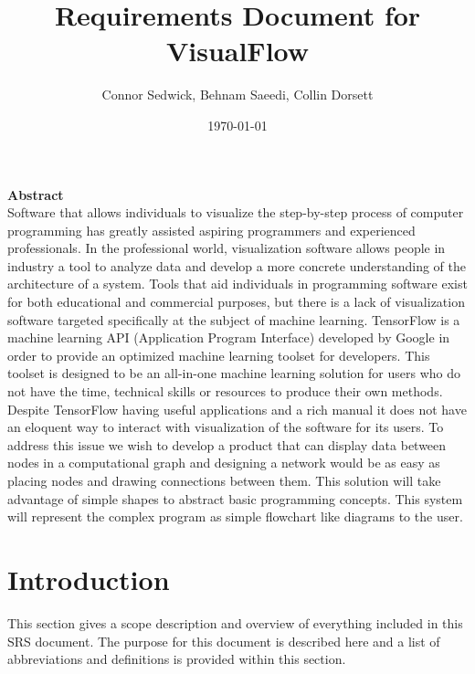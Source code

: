 \documentclass[journal,10pt,onecolumn,compsoc]{IEEEtran} \usepackage[margin=1.0in]{geometry} \usepackage{pdfpages} \usepackage{graphicx}
\title{Requirements Document for VisualFlow}
\author{Connor Sedwick, Behnam Saeedi,  Collin Dorsett}
\date{\today}
\begin{document}
\maketitle
\noindent \textbf{Abstract} \\
			\indent 
			Software that allows individuals to visualize the step-by-step process of computer programming has greatly assisted aspiring programmers and experienced professionals.
	In the professional world, visualization software allows people in industry a tool to analyze data and develop a more concrete understanding of the architecture of a system. 
	Tools that aid individuals in programming software exist for both educational and commercial purposes, but there is a lack of visualization software targeted specifically at the subject of machine learning.
			TensorFlow is a machine learning API (Application Program Interface) developed by Google in order to provide an optimized machine learning toolset for developers.
			 This toolset is designed to be an all-in-one machine learning solution for users who do not have the time, technical skills or resources to produce their own methods.
			 Despite TensorFlow having useful applications and a rich manual it does not have an eloquent way to interact with visualization of the software for its users.
			 To address this issue we wish to develop a product that can display data between nodes in a computational graph and designing a network would be as easy as placing nodes and drawing connections between them.
			 This solution will take advantage of simple shapes to abstract basic programming concepts.
			 This system will represent the complex program as simple flowchart like diagrams to the user.

\newpage
\tableofcontents
\newpage
\section{Introduction}

This section gives a scope description and overview of everything included in this SRS document. 
The purpose for this document is described here and a list of abbreviations and definitions is provided within this section.
\end{document}
